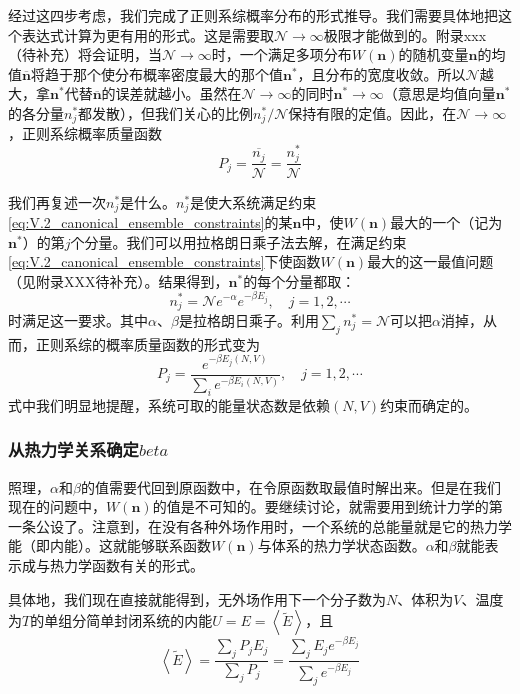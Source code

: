 \documentclass[main.tex]{subfiles}
\begin{document}
经过这四步考虑，我们完成了正则系综概率分布的形式推导。我们需要具体地把这个表达式计算为更有用的形式。这是需要取$\mathcal{N}\rightarrow\infty$极限才能做到的。附录xxx（待补充）将会证明，当$\mathcal{N}\rightarrow\infty$时，一个满足多项分布$W\left(\mathbf{n}\right)$的随机变量$\mathbf{n}$的均值$\overline{\mathbf{n}}$将趋于那个使分布概率密度最大的那个值$\mathbf{n}^*$，且分布的宽度收敛。所以$\mathcal{N}$越大，拿$\mathbf{n}^*$代替$\overline{\mathbf{n}}$的误差就越小。虽然在$\mathcal{N}\rightarrow\infty$的同时$\mathbf{n}^*\rightarrow\infty$（意思是均值向量$\mathbf{n}^*$的各分量$n_j^*$都发散），但我们关心的比例$n_j^*/\mathcal{N}$保持有限的定值。因此，在$\mathcal{N}\rightarrow\infty$，正则系综概率质量函数
\[P_j=\frac{\overline{n_j}}{\mathcal{N}}=\frac{n_j^*}{\mathcal{N}}\]

我们再复述一次$n_j^*$是什么。$n_j^*$是使大系统满足约束\eqref{eq:V.2_canonical_ensemble_constraints}的某$\mathbf{n}$中，使$W\left(\mathbf{n}\right)$最大的一个（记为$\mathbf{n}^*$）的第$j$个分量。我们可以用拉格朗日乘子法去解，在满足约束\eqref{eq:V.2_canonical_ensemble_constraints}下使函数$W\left(\mathbf{n}\right)$最大的这一最值问题（见附录XXX待补充）。结果得到，$\mathbf{n}^*$的每个分量都取：
\[n_j^*=\mathcal{N}e^{-\alpha}e^{-\beta E_j},\quad j=1,2,\cdots\]
时满足这一要求。其中$\alpha$、$\beta$是拉格朗日乘子。利用$\sum_jn_j^*=\mathcal{N}$可以把$\alpha$消掉，从而，正则系综的概率质量函数的形式变为
\[P_j=\frac{e^{-\beta E_j\left(N,V\right)}}{\sum_ie^{-\beta E_i\left(N,V\right)}},\quad j=1,2,\cdots\]
式中我们明显地提醒，系统可取的能量状态数是依赖$\left(N,V\right)$约束而确定的。

\subsubsection{从热力学关系确定$beta$}
照理，$\alpha$和$\beta$的值需要代回到原函数中，在令原函数取最值时解出来。但是在我们现在的问题中，$W\left(\mathbf{n}\right)$的值是不可知的。要继续讨论，就需要用到统计力学的第一条公设了。注意到，在没有各种外场作用时，一个系统的总能量就是它的热力学能（即内能）。这就能够联系函数$W\left(\mathbf{n}\right)$与体系的热力学状态函数。$\alpha$和$\beta$就能表示成与热力学函数有关的形式。

具体地，我们现在直接就能得到，无外场作用下一个分子数为$N$、体积为$V$、温度为$T$的单组分简单封闭系统的内能$U=E=\left\langle\tilde{E}\right\rangle$，且
\[\left\langle\tilde{E}\right\rangle=\frac{\sum_jP_jE_j}{\sum_jP_j}=\frac{\sum_jE_je^{-\beta E_j}}{\sum_je^{-\beta E_j}}\]
\end{document}
